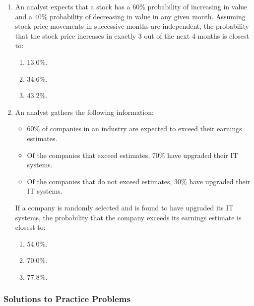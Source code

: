 \begin{enumerate}
	\item An analyst expects that a stock has a 60\% probability of increasing in value and a 40\% probability of decreasing in value in any given month. Assuming stock price movements in successive months are independent, the probability that the stock price increases in exactly 3 out of the next 4 months is closest to:
	      \begin{enumerate}[label=\Alph*.]
		      \item 13.0\%.
		      \item 34.6\%.
		      \item 43.2\%.
	      \end{enumerate}

	\item An analyst gathers the following information:
	      \begin{itemize}
		      \item 60\% of companies in an industry are expected to exceed their earnings estimates.
		      \item Of the companies that exceed estimates, 70\% have upgraded their IT systems.
		      \item Of the companies that do not exceed estimates, 30\% have upgraded their IT systems.
	      \end{itemize}
	      If a company is randomly selected and is found to have upgraded its IT systems, the probability that the company exceeds its earnings estimate is closest to:
	      \begin{enumerate}[label=\Alph*.]
		      \item 54.0\%.
		      \item 70.0\%.
		      \item 77.8\%.
	      \end{enumerate}
\end{enumerate}

\subsubsection{Solutions to Practice Problems}
\label{subsec:app_Solutions_M6}

